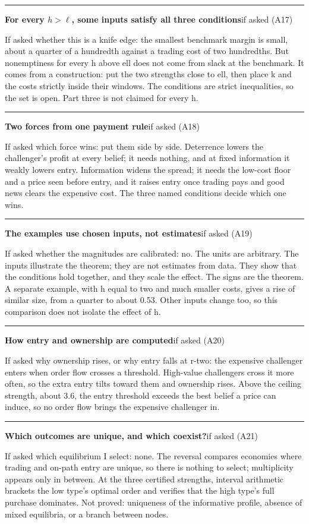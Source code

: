 \documentclass[11pt]{article}
\newcommand{\scriptframe}[3]{%
  \Needspace{9\baselineskip}%
  \par\medskip\noindent\textcolor{ScriptBlue}{\rule{\linewidth}{0.55pt}}%
  \par\smallskip\noindent
  \textbf{#1}\hfill\textcolor{ScriptGray}{\small #2}\par\smallskip
  #3\par}
\begin{document}
\scriptframe{For every $h>\ell$, some inputs satisfy all three conditions}{if asked (A17)}{%
  If asked whether this is a knife edge: the smallest benchmark margin is small,
  about a quarter of a hundredth against a trading cost of two hundredths.
  But nonemptiness for every h above ell does not come from slack at the
  benchmark. It comes from a construction: put the two strengths close to ell,
  then place k and the costs strictly inside their windows. The conditions are
  strict inequalities, so the set is open. Part three is not claimed for every h.
}

\scriptframe{Two forces from one payment rule}{if asked (A18)}{%
  If asked which force wins: put them side by side. Deterrence lowers the
  challenger's profit at every belief; it needs nothing, and at fixed
  information it weakly lowers entry. Information widens the spread; it needs
  the low-cost floor and a price seen before entry, and it raises entry once
  trading pays and good news clears the expensive cost. The three named
  conditions decide which one wins.
}

\scriptframe{The examples use chosen inputs, not estimates}{if asked (A19)}{%
  If asked whether the magnitudes are calibrated: no. The units are arbitrary.
  The inputs illustrate the theorem; they are not estimates from data. They
  show that the conditions hold together, and they scale the effect. The signs
  are the theorem. A separate example, with h equal to two and much smaller
  costs, gives a rise of similar size, from a quarter to about 0.53. Other
  inputs change too, so this comparison does not isolate the effect of h.
}

\scriptframe{How entry and ownership are computed}{if asked (A20)}{%
  If asked why ownership rises, or why entry falls at r-two: the expensive
  challenger enters when order flow crosses a threshold. High-value challengers
  cross it more often, so the extra entry tilts toward them and ownership rises.
  Above the ceiling strength, about 3.6, the entry threshold exceeds the best
  belief a price can induce, so no order flow brings the expensive challenger
  in.
}

\scriptframe{Which outcomes are unique, and which coexist?}{if asked (A21)}{%
  If asked which equilibrium I select: none. The reversal compares economies
  where trading and on-path entry are unique, so there is nothing to select;
  multiplicity appears only in between. At the three certified strengths,
  interval arithmetic brackets the low type's optimal order and verifies that
  the high type's full purchase dominates. Not proved: uniqueness of the
  informative profile, absence of mixed equilibria, or a branch between nodes.
}
\end{document}
